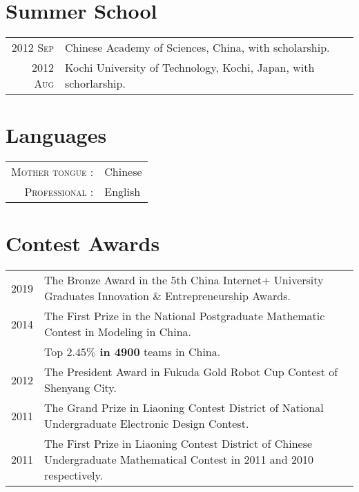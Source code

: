 \documentclass[a4paper,10pt]{article}
\begin{document}
\section{Summer School}
\begin{tabular}{r|p{13cm}}

  \textsc{2012 Sep}  & Chinese Academy of Sciences, China, with scholarship. \\

  \textsc{2012 Aug}  & Kochi University of Technology, Kochi, Japan, with schorlarship. \\

\end{tabular}


\section{Languages}

\begin{tabular}{rp{10cm}}

  \textsc{Mother tongue :} & Chinese \\

  \textsc{Professional :} & English \\

\end{tabular}


\section{Contest Awards}

\begin{longtable}[H]{r|p{13.5cm}}
  \hspace{20pt} \textsc{2019} & The Bronze Award in the $5$th China Internet+ University Graduates Innovation \& Entrepreneurship Awards. \\

  \textsc{2014} & The First Prize in the National Postgraduate Mathematic Contest in Modeling in China.\\
                              & Top \textbf{$\mathbf{2.45\%}$ in 4900} teams in China.\\

  \textsc{2012} & The President Award in Fukuda Gold Robot Cup Contest of Shenyang City. \\

  \textsc{2011} & The Grand Prize in Liaoning Contest District of National Undergraduate Electronic Design Contest. \\

  \textsc{2011} & The First Prize in Liaoning Contest District of Chinese Undergraduate Mathematical Contest in 2011 and
                  2010 respectively. \\
\end{longtable}
\end{document}
